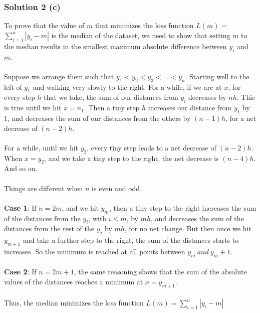 \documentclass{assignment}
\begin{document}
\begin{problem}
\subsubsection*{Solution 2 (c)}
\noindent To prove that the value of $m$ that minimizes the loss function $L(m)$ = $\sum_{i=1}^n|y_i-m|$ is the median of the dataset, we need to show that setting $m$ to the median results in the smallest maximum absolute difference between $y_i$ and $m$.
\\
\\
Suppose we arrange them such that $y_1<y_2<y_3<...<y_n$.
Starting well to the left of $y_1$ and walking very slowly to the right. For a while, if we are at $x$, for every step $h$ that we take, the sum of our distances from $y_i$ decreases by $nh$. This is true until we hit $x = n_1$. Then a tiny step $h$ increases our distance from $y_1$ by 1, and decreases the sum of our distances from the others by $(n-1)h$, for a net decrease of $(n-2)h$.\\ \\ 
For a while, until we hit $y_2$, every tiny step leads to a net decrease of $(n-2)h$. When $x=y_2$, and we take a tiny step to the right, the net decrease is $(n-4)h$. And so on.\\ \\ 
Things are different when $n$ is even and odd.
\\
\\
\textbf{Case 1}: If $n = 2m$, and we hit $y_m$, then a tiny step to the right increases the sum of the distances from the $y_i$, with $i\leq m$, by $mh$, and decreases the sum of the distances from the rest of the $y_j$ by $mh$, for no net change. But then once we hit $y_{m+1}$ and take a further step to the right, the sum of the distances starts to increases. So the minimum is reached at all points between $y_m\ and\ y_m+1$. 
\\
\\
\textbf{Case 2}: If $n=2m+1$, the same reasoning shows that the sum of the absolute values of the distances reaches a minimum at $x = y_{m+1}$.
\\
\\
Thus, the median minimizes the loss function $L(m) = \sum_{i=1}^n|y_i-m|$
\\


\end{problem}
\end{document}
